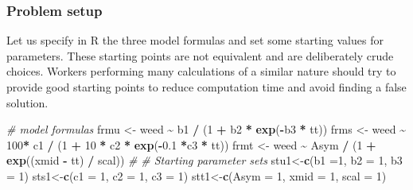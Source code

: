 \documentclass[
]{article}
\newenvironment{Shaded}{\begin{snugshade}}{\end{snugshade}}
\newcommand{\AttributeTok}[1]{\textcolor[rgb]{0.13,0.29,0.53}{#1}}
\newcommand{\CommentTok}[1]{\textcolor[rgb]{0.56,0.35,0.01}{\textit{#1}}}
\newcommand{\DecValTok}[1]{\textcolor[rgb]{0.00,0.00,0.81}{#1}}
\newcommand{\FloatTok}[1]{\textcolor[rgb]{0.00,0.00,0.81}{#1}}
\newcommand{\FunctionTok}[1]{\textcolor[rgb]{0.13,0.29,0.53}{\textbf{#1}}}
\newcommand{\NormalTok}[1]{#1}
\newcommand{\OtherTok}[1]{\textcolor[rgb]{0.56,0.35,0.01}{#1}}
\newcommand{\SpecialCharTok}[1]{\textcolor[rgb]{0.81,0.36,0.00}{\textbf{#1}}}
\begin{document}
\hypertarget{problem-setup}{%
\subsubsection{Problem setup}\label{problem-setup}}

Let us specify in R the three model formulas and set some starting
values for parameters. These starting points are not equivalent and are
deliberately crude choices. Workers performing many calculations of a
similar nature should try to provide good starting points to reduce
computation time and avoid finding a false solution.

\begin{Shaded}
\begin{Highlighting}[]
\CommentTok{\# model formulas}
\NormalTok{frmu }\OtherTok{\textless{}{-}}\NormalTok{ weed }\SpecialCharTok{\textasciitilde{}}\NormalTok{ b1 }\SpecialCharTok{/}\NormalTok{ (}\DecValTok{1} \SpecialCharTok{+}\NormalTok{ b2 }\SpecialCharTok{*} \FunctionTok{exp}\NormalTok{(}\SpecialCharTok{{-}}\NormalTok{b3 }\SpecialCharTok{*}\NormalTok{ tt))}
\NormalTok{frms }\OtherTok{\textless{}{-}}\NormalTok{ weed }\SpecialCharTok{\textasciitilde{}} \DecValTok{100}\SpecialCharTok{*}\NormalTok{ c1 }\SpecialCharTok{/}\NormalTok{ (}\DecValTok{1} \SpecialCharTok{+} \DecValTok{10} \SpecialCharTok{*}\NormalTok{ c2 }\SpecialCharTok{*} \FunctionTok{exp}\NormalTok{(}\SpecialCharTok{{-}}\FloatTok{0.1} \SpecialCharTok{*}\NormalTok{c3 }\SpecialCharTok{*}\NormalTok{ tt))}
\NormalTok{frmt }\OtherTok{\textless{}{-}}\NormalTok{ weed }\SpecialCharTok{\textasciitilde{}}\NormalTok{ Asym }\SpecialCharTok{/}\NormalTok{ (}\DecValTok{1} \SpecialCharTok{+} \FunctionTok{exp}\NormalTok{((xmid }\SpecialCharTok{{-}}\NormalTok{ tt) }\SpecialCharTok{/}\NormalTok{ scal))}
\CommentTok{\#}
\CommentTok{\# Starting parameter sets}
\NormalTok{stu1}\OtherTok{\textless{}{-}}\FunctionTok{c}\NormalTok{(}\AttributeTok{b1 =}\DecValTok{1}\NormalTok{, }\AttributeTok{b2 =} \DecValTok{1}\NormalTok{, }\AttributeTok{b3 =} \DecValTok{1}\NormalTok{)}
\NormalTok{sts1}\OtherTok{\textless{}{-}}\FunctionTok{c}\NormalTok{(}\AttributeTok{c1 =} \DecValTok{1}\NormalTok{, }\AttributeTok{c2 =} \DecValTok{1}\NormalTok{, }\AttributeTok{c3 =} \DecValTok{1}\NormalTok{)}
\NormalTok{stt1}\OtherTok{\textless{}{-}}\FunctionTok{c}\NormalTok{(}\AttributeTok{Asym =} \DecValTok{1}\NormalTok{, }\AttributeTok{xmid =} \DecValTok{1}\NormalTok{, }\AttributeTok{scal =} \DecValTok{1}\NormalTok{)}
\end{Highlighting}
\end{Shaded}
\end{document}
